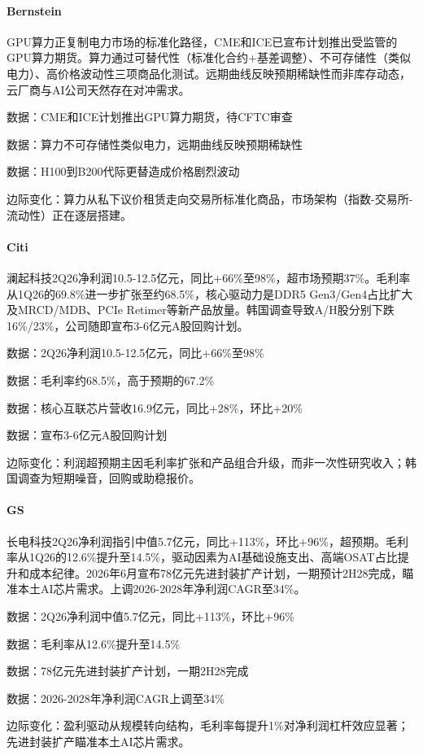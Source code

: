 \documentclass[11pt]{ctexart}
\begin{document}
\paragraph{Bernstein} GPU算力正复制电力市场的标准化路径，CME和ICE已宣布计划推出受监管的GPU算力期货。算力通过可替代性（标准化合约+基差调整）、不可存储性（类似电力）、高价格波动性三项商品化测试。远期曲线反映预期稀缺性而非库存动态，云厂商与AI公司天然存在对冲需求。
{\small\color{refgray}数据：CME和ICE计划推出GPU算力期货，待CFTC审查\par}
{\small\color{refgray}数据：算力不可存储性类似电力，远期曲线反映预期稀缺性\par}
{\small\color{refgray}数据：H100到B200代际更替造成价格剧烈波动\par}
{\small\color{refgray}边际变化：算力从私下议价租赁走向交易所标准化商品，市场架构（指数-交易所-流动性）正在逐层搭建。\par}
\paragraph{Citi} 澜起科技2Q26净利润10.5-12.5亿元，同比+66\%至98\%，超市场预期37\%。毛利率从1Q26的69.8\%进一步扩张至约68.5\%，核心驱动力是DDR5 Gen3/Gen4占比扩大及MRCD/MDB、PCIe Retimer等新产品放量。韩国调查导致A/H股分别下跌16\%/23\%，公司随即宣布3-6亿元A股回购计划。
{\small\color{refgray}数据：2Q26净利润10.5-12.5亿元，同比+66\%至98\%\par}
{\small\color{refgray}数据：毛利率约68.5\%，高于预期的67.2\%\par}
{\small\color{refgray}数据：核心互联芯片营收16.9亿元，同比+28\%，环比+20\%\par}
{\small\color{refgray}数据：宣布3-6亿元A股回购计划\par}
{\small\color{refgray}边际变化：利润超预期主因毛利率扩张和产品组合升级，而非一次性研究收入；韩国调查为短期噪音，回购或助稳报价。\par}
\paragraph{GS} 长电科技2Q26净利润指引中值5.7亿元，同比+113\%，环比+96\%，超预期。毛利率从1Q26的12.6\%提升至14.5\%，驱动因素为AI基础设施支出、高端OSAT占比提升和成本纪律。2026年6月宣布78亿元先进封装扩产计划，一期预计2H28完成，瞄准本土AI芯片需求。上调2026-2028年净利润CAGR至34\%。
{\small\color{refgray}数据：2Q26净利润中值5.7亿元，同比+113\%，环比+96\%\par}
{\small\color{refgray}数据：毛利率从12.6\%提升至14.5\%\par}
{\small\color{refgray}数据：78亿元先进封装扩产计划，一期2H28完成\par}
{\small\color{refgray}数据：2026-2028年净利润CAGR上调至34\%\par}
{\small\color{refgray}边际变化：盈利驱动从规模转向结构，毛利率每提升1\%对净利润杠杆效应显著；先进封装扩产瞄准本土AI芯片需求。\par}
\end{document}
